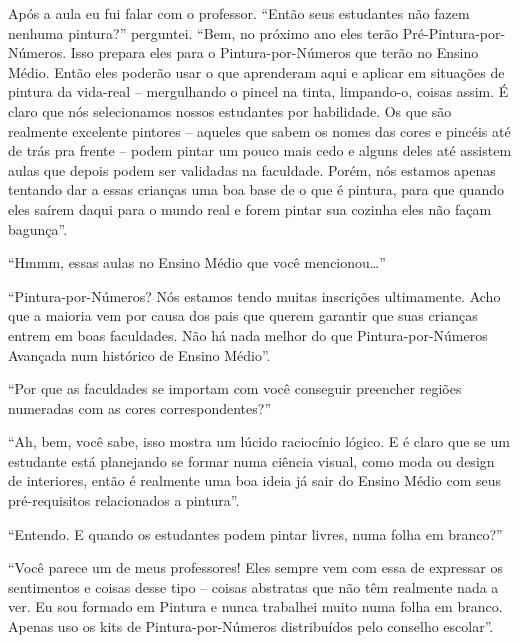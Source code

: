\documentclass[a4paper,oneside,10pt,notitlepage]{article}
\begin{document}
Após a aula eu fui falar com o professor.
``Então seus estudantes não fazem nenhuma pintura?''
perguntei.
``Bem, no próximo ano eles terão Pré-Pintura-por-Números.
Isso prepara eles para o Pintura-por-Números que terão no Ensino Médio.
Então eles poderão usar o que aprenderam aqui e aplicar em situações de pintura da vida-real -- mergulhando o pincel na tinta, limpando-o, coisas assim.
É claro que nós selecionamos nossos estudantes por habilidade.
Os que são realmente excelente pintores -- aqueles que sabem os nomes das cores e pincéis até de trás pra frente -- podem pintar um pouco mais cedo e alguns deles até assistem aulas que depois podem ser validadas na faculdade.
Porém, nós estamos apenas tentando dar a essas crianças uma boa base de o que é pintura, para que quando eles saírem daqui para o mundo real e forem pintar sua cozinha eles não façam bagunça''.

``Hmmm, essas aulas no Ensino Médio que você mencionou\ldots{}''

``Pintura-por-Números?
Nós estamos tendo muitas inscrições ultimamente.
Acho que a maioria vem por causa dos pais que querem garantir que suas crianças entrem em boas faculdades.
Não há nada melhor do que Pintura-por-Números Avançada num histórico de Ensino Médio''.

``Por que as faculdades se importam com você conseguir preencher regiões numeradas com as cores correspondentes?''

``Ah, bem, você sabe, isso mostra um lúcido raciocínio lógico.
E é claro que se um estudante está planejando se formar numa ciência visual, como moda ou design de interiores, então é realmente uma boa ideia já sair do Ensino Médio com seus pré-requisitos relacionados a pintura''.

``Entendo.
E quando os estudantes podem pintar livres, numa folha em branco?''

``Você parece um de meus professores!
Eles sempre vem com essa de expressar os sentimentos e coisas desse tipo -- coisas abstratas que não têm realmente nada a ver.
Eu sou formado em Pintura e nunca trabalhei muito numa folha em branco.
Apenas uso os kits de Pintura-por-Números distribuídos pelo conselho escolar''.
\end{document}
